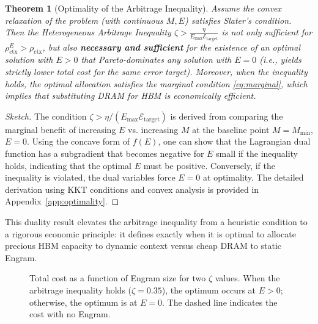 \documentclass[11pt,a4paper]{article}
\theoremstyle{plain}
\newtheorem{theorem}{Theorem}[section]
\theoremstyle{definition}
\begin{document}
\begin{theorem}[Optimality of the Arbitrage Inequality]
Assume the convex relaxation of the problem (with continuous $M,E$) satisfies Slater's condition. Then the Heterogeneous Arbitrage Inequality $\zeta > \frac{\eta}{E_{\max}\mathcal{E}_{\text{target}}}$ is not only sufficient for $\rho_{\text{ctx}}^E > \rho_{\text{ctx}}$, but also \textbf{necessary and sufficient} for the existence of an optimal solution with $E>0$ that Pareto-dominates any solution with $E=0$ (i.e., yields strictly lower total cost for the same error target). Moreover, when the inequality holds, the optimal allocation satisfies the marginal condition \eqref{eq:marginal}, which implies that substituting DRAM for HBM is economically efficient.
\end{theorem}
\begin{proof}[Sketch]
The condition $\zeta > \eta/(E_{\max}\mathcal{E}_{\text{target}})$ is derived from comparing the marginal benefit of increasing $E$ vs. increasing $M$ at the baseline point $M=M_{\min}$, $E=0$. Using the concave form of $f(E)$, one can show that the Lagrangian dual function has a subgradient that becomes negative for $E$ small if the inequality holds, indicating that the optimal $E$ must be positive. Conversely, if the inequality is violated, the dual variables force $E=0$ at optimality. The detailed derivation using KKT conditions and convex analysis is provided in Appendix~\ref{app:optimality}.
\end{proof}

This duality result elevates the arbitrage inequality from a heuristic condition to a rigorous economic principle: it defines exactly when it is optimal to allocate precious HBM capacity to dynamic context versus cheap DRAM to static Engram.

\begin{figure}[t]
\centering
{}
\caption{Total cost as a function of Engram size for two $\zeta$ values. When the arbitrage inequality holds ($\zeta=0.35$), the optimum occurs at $E>0$; otherwise, the optimum is at $E=0$. The dashed line indicates the cost with no Engram.}
\label{fig:duality}
\end{figure}
\end{document}
